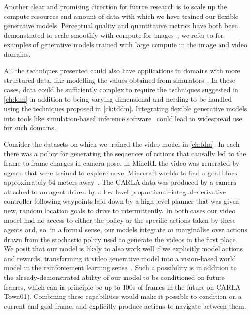 Another clear and promising direction for future research is to scale up the compute resources and amount of data with which we have trained our flexible generative models. Perceptual quality and quantitative metrics have both been demonstrated to scale smoothly with compute for images~\citep{peebles2022scalable}; we refer to \citet{esser2024scaling,brooks2024video} for examples of generative models trained with large compute in the image and video domains.

All the techniques presented could also have applications in domains with more structured data, like modelling the values obtained from simulators~\citep{weilbach2023graphically}. In these cases, data could be sufficiently complex to require the techniques suggested in \cref{ch:fdm} in addition to being varying-dimensional and needing to be handled using the techniques proposed in \cref{ch:tddm}. Integrating flexible generative models into tools like simulation-based inference software~\citep{gloeckler2024all} could lead to widespread use for such domains.

Consider the datasets on which we trained the video model in \cref{ch:fdm}. In each there was a policy for generating the sequences of actions that causally led to the frame-to-frame changes in camera pose. In MineRL the video was generated by agents that were trained to explore novel Minecraft worlds to find a goal block approximately 64 meters away~\citep{saxena2021clockwork}. The CARLA data was produced by a camera attached to an agent driven by a low level proportional–integral–derivative controller following waypoints laid down by a high level planner that was given new, random location goals to
drive to intermittently. In both cases our video model had no access to either the policy or the specific actions taken by these agents and, so, in a formal sense, our models integrate or marginalise over actions drawn from the stochastic policy used to generate the videos in the first place. We posit that our model is likely to also work well if we explicitly model actions and rewards, transforming it video generative model into a vision-based world model in the reinforcement learning sense~\citep{kaiser2019model}. Such a possibility is in addition to the already-demonstrated ability of our model to be conditioned on future frames, which can in principle be up to 100s of frames in the future on CARLA Town01). Combining these capabilities would make it possible to condition on a current and goal frame, and explicitly produce actions to navigate between them.

